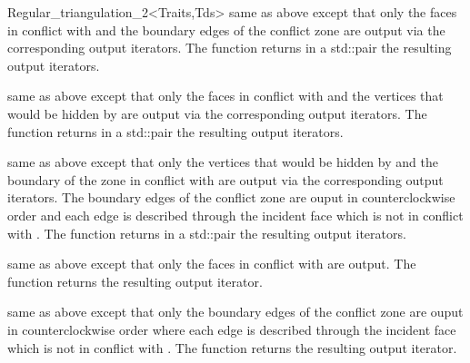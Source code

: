 \begin{ccRefClass}{Regular_triangulation_2<Traits,Tds>}
{
  same as above except that only the faces in conflict with  and 
  the boundary edges of the conflict zone 
  are output via the corresponding output iterators. The function returns 
  in a std::pair the resulting output iterators.}

{
  same as above except that only the faces in conflict with  and 
  the vertices that would be hidden by 
  are output via the corresponding output iterators. The function returns 
  in a std::pair the resulting output iterators.}

{ same as above except that only the vertices that would be hidden
  by  and the boundary of the zone in conflict with  are
  output via the corresponding output iterators. The boundary edges of
  the conflict zone are ouput in counterclockwise order and each edge
  is described through the incident face which is not in conflict with
  . The function returns in a std::pair the resulting output
  iterators.}

{same as above except that only the faces in conflict with 
are output. The function returns the resulting output iterator.}

{ same as above except that only the boundary edges
of the conflict zone are ouput in counterclockwise order
where each edge is described  through the incident face
which is not in conflict with .
The function returns the resulting output iterator.}


\end{ccRefClass}

